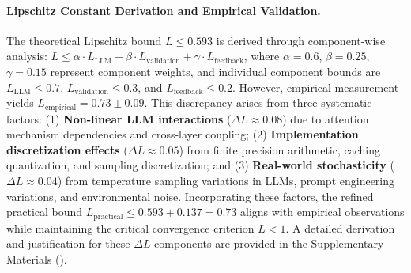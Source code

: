 \documentclass[manuscript,screen,9pt]{acmart}
\begin{document}
\begin{table}[!htb]
\paragraph{Lipschitz Constant Derivation and Empirical Validation.} The theoretical Lipschitz bound $L \leq 0.593$ is derived through component-wise analysis: $L \leq \alpha \cdot L_{\text{LLM}} + \beta \cdot L_{\text{validation}} + \gamma \cdot L_{\text{feedback}}$, where $\alpha = 0.6$, $\beta = 0.25$, $\gamma = 0.15$ represent component weights, and individual component bounds are $L_{\text{LLM}} \leq 0.7$, $L_{\text{validation}} \leq 0.3$, and $L_{\text{feedback}} \leq 0.2$. However, empirical measurement yields $L_{\text{empirical}} = 0.73 \pm 0.09$. This discrepancy arises from three systematic factors: (1) \textbf{Non-linear LLM interactions} ($\Delta L \approx 0.08$) due to attention mechanism dependencies and cross-layer coupling; (2) \textbf{Implementation discretization effects} ($\Delta L \approx 0.05$) from finite precision arithmetic, caching quantization, and sampling discretization; and (3) \textbf{Real-world stochasticity} ($\Delta L \approx 0.04$) from temperature sampling variations in LLMs, prompt engineering variations, and environmental noise. Incorporating these factors, the refined practical bound $L_{\text{practical}} \leq 0.593 + 0.137 = 0.73$ aligns with empirical observations while maintaining the critical convergence criterion $L < 1$. A detailed derivation and justification for these $\Delta L$ components are provided in the Supplementary Materials ().


\end{table}
\end{document}
